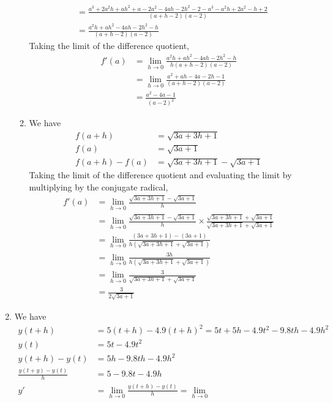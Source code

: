 \documentclass{article}
\begin{document}
\begin{enumerate}
\begin{enumerate}
\begin{align*}
             &= \frac{a^3 + 2a^2h + ah^2 + a - 2a^2-4ah-2h^2-2
               - a^3 - a^2h + 2a^2 - h + 2}{(a+h-2)(a-2)} \\
             &= \frac{a^2h + ah^2 - 4ah - 2h^2 - h}{(a+h-2)(a-2)}
    \end{align*}
    Taking the limit of the difference quotient,
    \begin{align*}
      f'(a) &= \lim_{h\to 0} \frac{a^2h+ah^2-4ah-2h^2-h}{h(a+h-2)(a-2)} \\
            &= \lim_{h\to 0} \frac{a^2 + ah - 4a - 2h - 1}{(a+h-2)(a-2)} \\
            &= \frac{a^2 - 4a - 1}{(a-2)^2}
    \end{align*}
  \item We have
    \begin{align*}
      f(a+h) &= \sqrt{3a + 3h + 1} \\
      f(a) &= \sqrt{3a+1} \\
      f(a+h)-f(a) &= \sqrt{3a + 3h + 1} - \sqrt{3a + 1}
    \end{align*}
    Taking the limit of the difference quotient and evaluating the
    limit by multiplying by the conjugate radical,
    \begin{align*}
      f'(a) &= \lim_{h\to 0} \frac{\sqrt{3a+3h+1}-\sqrt{3a+1}}{h} \\
            &= \lim_{h\to 0} \frac{\sqrt{3a+3h+1}-\sqrt{3a+1}}{h}
       \times \frac{\sqrt{3a+3h+1}+\sqrt{3a+1}}{\sqrt{3a+3h+1}+\sqrt{3a+1}} \\
     &= \lim_{h\to 0} \frac{(3a+3h+1)-(3a+1)}{h(\sqrt{3a+3h+1}+\sqrt{3a+1})} \\
            &= \lim_{h\to 0} \frac{3h}{h(\sqrt{3a+3h+1}+\sqrt{3a+1})} \\
            &= \lim_{h\to 0} \frac{3}{\sqrt{3a+3h+1}+\sqrt{3a+1}} \\
            &= \frac{3}{2\sqrt{3a+1}}
    \end{align*}
  \end{enumerate}
\item %
  We have
  \begin{align*}
    y(t+h) &= 5(t+h) - 4.9(t+h)^2 = 5t + 5h - 4.9t^2 - 9.8 th - 4.9
             h^2 \\
    y(t) &= 5t - 4.9 t^2 \\
    y(t+h) - y(t) &= 5h - 9.8 th - 4.9 h^2 \\
    \frac{y(t+y)-y(t)}{h} &= 5 - 9.8 t - 4.9 h \\
    y' &= \lim_{h\to 0} \frac{y(t+h)-y(t)}{h} = \lim_{h\to 0}

\end{align*}
\end{enumerate}
\end{document}
